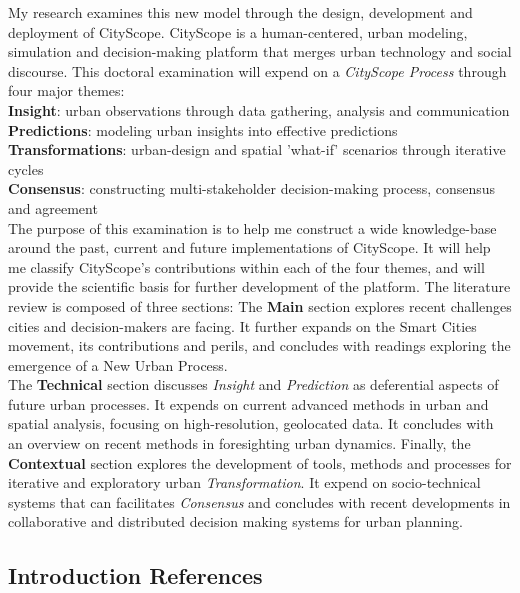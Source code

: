 \par
My research examines this new model through the design, development and deployment of CityScope. CityScope is a human-centered, urban modeling, simulation and decision-making platform that merges urban technology and social discourse. This doctoral examination will expend on a \textit{CityScope Process} through four major themes:
\\
\textbf{Insight}: urban observations through data gathering, analysis and communication 
\\
\textbf{Predictions}: modeling urban insights into effective predictions
\\
\textbf{Transformations}: urban-design and spatial 'what-if' scenarios through iterative cycles 
\\
\textbf{Consensus}: constructing multi-stakeholder decision-making process, consensus and agreement 
\\
The purpose of this examination is to help me construct a wide knowledge-base around the past, current and future implementations of CityScope. It will help me classify CityScope's contributions within each of the four themes, and will provide the scientific basis for further development of the platform. 
The literature review is composed of three sections: The \textbf{Main} section explores recent challenges cities and decision-makers are facing. It further expands on the Smart Cities movement, its contributions and perils, and concludes with readings exploring the emergence of a New Urban Process. \\
The \textbf{Technical} section discusses \textit{Insight} and \textit{Prediction} as deferential aspects of future urban processes. It expends on current advanced methods in urban and spatial analysis, focusing on high-resolution, geolocated data. It concludes with an overview on recent methods in foresighting urban dynamics.   
Finally, the \textbf{Contextual} section explores the development of tools, methods and processes for iterative and exploratory urban \textit{Transformation}. It expend on socio-technical systems that can facilitates \textit{Consensus} and concludes with recent developments in collaborative and distributed decision making systems for urban planning. 
% 
\subsection*{Introduction References}


